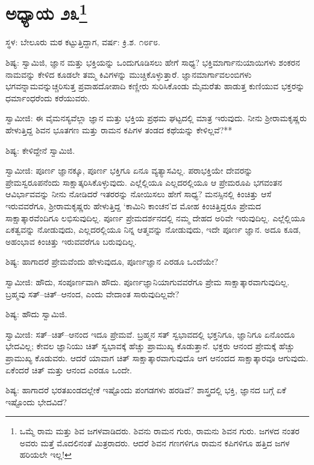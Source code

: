 \newpage

\chapter[ಅಧ್ಯಾಯ ೨೩]{ಅಧ್ಯಾಯ ೨೩\protect\footnote{ಒಮ್ಮೆ ರಾಮ ಮತ್ತು ಶಿವ ಜಗಳವಾಡಿದರು. ಶಿವನು ರಾಮನ ಗುರು, ರಾಮನು ಶಿವನ ಗುರು. ಜಗಳದ ನಂತರ ಅವರು ಮತ್ತೆ ಮೊದಲಿನಂತೆ ಮಿತ್ರರಾದರು. ಆದರೆ ಶಿವನ ಗಣಗಳಿಗೂ ರಾಮನ ಕಪಿಗಳಿಗೂ ಹತ್ತಿದ ಜಗಳ ಹರಿಯಲೇ ಇಲ್ಲ!}}

\centerline{ಸ್ಥಳ: ಬೇಲೂರು ಮಠ ಕಟ್ಟುತ್ತಿದ್ದಾಗ, ವರ್ಷ: ಕ್ರಿ.ಶ. ೧೮೯೮.}

ಶಿಷ್ಯ: ಸ್ವಾಮಿಜಿ, ಜ್ಞಾನ ಮತ್ತು ಭಕ್ತಿಯನ್ನು ಒಂದುಗೂಡಿಸಲು ಹೇಗೆ ಸಾಧ್ಯ? ಭಕ್ತಿಮಾರ್ಗಾನುಯಾಯಿಗಳು ಶಂಕರನ ನಾಮವನ್ನು ಕೇಳಿದ ಕೂಡಲೇ ತಮ್ಮ ಕಿವಿಗಳನ್ನು ಮುಚ್ಚಿಕೊಳ್ಳುತ್ತಾರೆ. ಜ್ಞಾನಮಾರ್ಗಾವಲಂಬಿಗಳು ಭಗವನ್ನಾಮವನ್ನುಚ್ಚರಿಸುತ್ತ ಪ್ರವಾಹದೋಪಾದಿ ಕಣ್ಣೀರು ಸುರಿಸಿಕೊಂಡು ಮೈಮರೆತು ಹಾಡುತ್ತ ಕುಣಿಯುವ ಭಕ್ತರನ್ನು ಧರ್ಮಾಂಧರೆಂದು ಕರೆಯುವರು.

ಸ್ವಾಮೀಜಿ: ಈ ವೈಮನಸ್ಯವೆಲ್ಲಾ ಜ್ಞಾನ ಮತ್ತು ಭಕ್ತಿಯ ಪ್ರಥಮ ಘಟ್ಟದಲ್ಲಿ ಮಾತ್ರ ಇರುವುದು. ನೀನು ಶ‍್ರೀರಾಮಕೃಷ್ಣರು ಹೇಳುತ್ತಿದ್ದ ಶಿವನ ಭೂತಗಣ ಮತ್ತು ರಾಮನ ಕಪಿಗಳ ತಂಡದ ಕಥೆಯನ್ನು ಕೇಳಿಲ್ಲವೆ?**

ಶಿಷ್ಯ: ಕೇಳಿದ್ದೇನೆ ಸ್ವಾಮಿಜಿ.

ಸ್ವಾಮೀಜಿ: ಪೂರ್ಣ ಜ್ಞಾನಕ್ಕೂ, ಪೂರ್ಣ ಭಕ್ತಿಗೂ ಏನೂ ವ್ಯತ್ಯಾಸವಿಲ್ಲ. ಪರಾಭಕ್ತಿಯೇ ದೇವರನ್ನು ಪ್ರೇಮಸ್ವರೂಪನೆಂದು ಸಾಕ್ಷಾತ್ಕರಿಸಿಕೊಳ್ಳುವುದು. ಎಲ್ಲೆಲ್ಲಿಯೂ ಎಲ್ಲದರಲ್ಲಿಯೂ ಆ ಪ್ರೇಮರೂಪಿ ಭಗವಂತನ ಆವಿರ್ಭಾವವನ್ನು ನೀನು ನೋಡಿದರೆ ಇತರರನ್ನು ನೋಯಿಸಲು ಹೇಗೆ ಸಾಧ್ಯ? ಮನಸ್ಸಿನಲ್ಲಿ ಕಿಂಚಿತ್ತು ಆಸೆ ಇರುವವರೆಗೂ, ಶ‍್ರೀರಾಮಕೃಷ್ಣರು ಹೇಳುತ್ತಿದ್ದ ‘ಕಾಮಿನಿ ಕಾಂಚನ’ದ ಮೋಹ ಕಿಂಚಿತ್ತಿದ್ದರೂ ಪ್ರೇಮದ ಸಾಕ್ಷಾತ್ಕಾರವೆಂದಿಗೂ ಲಭಿಸುವುದಿಲ್ಲ. ಪೂರ್ಣ ಪ್ರೇಮದರ್ಶನದಲ್ಲಿ ನಮ್ಮ ದೇಹದ ಅರಿವೇ ಇರುವುದಿಲ್ಲ. ಎಲ್ಲೆಲ್ಲಿಯೂ ಏಕತ್ವವನ್ನು ನೋಡುವುದು, ಎಲ್ಲದರಲ್ಲಿಯೂ ನಿನ್ನ ಆತ್ಮವನ್ನು ನೋಡುವುದು, ಇದೇ ಪೂರ್ಣ ಜ್ಞಾನ. ಅದೂ ಕೂಡ, ಅಹಂಭಾವ ಕಿಂಚಿತ್ತು ಇರುವವರೆಗೂ ಬರುವುದಿಲ್ಲ.

ಶಿಷ್ಯ: ಹಾಗಾದರೆ ಪ್ರೇಮವೆಂದು ಹೇಳುವುದೂ, ಪೂರ್ಣಜ್ಞಾನ ಎರಡೂ ಒಂದೆಯೇ?

ಸ್ವಾಮೀಜಿ: ಹೌದು, ಸಂಪೂರ್ಣವಾಗಿ ಹೌದು. ಪೂರ್ಣಜ್ಞಾನಿಯಾಗುವವರೆಗೂ ಪ್ರೇಮ ಸಾಕ್ಷಾತ್ಕಾರವಾಗುವುದಿಲ್ಲ. ಬ್ರಹ್ಮವು ಸತ್–ಚಿತ್–ಆನಂದ, ಎಂದು ವೇದಾಂತ ಸಾರುವುದಿಲ್ಲವೇ?

ಶಿಷ್ಯ: ಹೌದು ಸ್ವಾಮಿಜಿ.

ಸ್ವಾಮೀಜಿ: ಸತ್–ಚಿತ್–ಆನಂದ ಇದೂ ಪ್ರೇಮವೆ. ಬ್ರಹ್ಮನ ಸತ್ ಸ್ವಭಾವದಲ್ಲಿ ಭಕ್ತನಿಗೂ, ಜ್ಞಾನಿಗೂ ಏನೊಂದೂ ಭೇದವಿಲ್ಲ; ಕೇವಲ ಜ್ಞಾನಿಯು ಚಿತ್ ಸ್ವಭಾವಕ್ಕೆ ಹೆಚ್ಚು ಪ್ರಾಮುಖ್ಯ ಕೊಡುತ್ತಾನೆ. ಭಕ್ತರು ಆನಂದ ಪ್ರೇಮಕ್ಕೆ ಹೆಚ್ಚು ಪ್ರಾಮುಖ್ಯ ಕೊಡುವರು. ಆದರೆ ಯಾವಾಗ ಚಿತ್ ಸಾಕ್ಷಾತ್ಕಾರವಾಗುವುದೊ ಆಗ ಆನಂದದ ಸಾಕ್ಷಾತ್ಕಾರವೂ ಆಗುವುದು. ಏಕೆಂದರೆ ಚಿತ್ ಮತ್ತು ಆನಂದ ಎರಡೂ ಒಂದೇ.

ಶಿಷ್ಯ: ಹಾಗಾದರೆ ಭರತಖಂಡದಲ್ಲೇಕೆ ಇಷ್ಟೊಂದು ಪಂಗಡಗಳು ಹರಡಿವೆ? ಶಾಸ್ತ್ರದಲ್ಲಿ ಭಕ್ತಿ, ಜ್ಞಾನದ ಬಗ್ಗೆ ಏಕೆ ಇಷ್ಟೊಂದು ಭೇದವಿದೆ?

